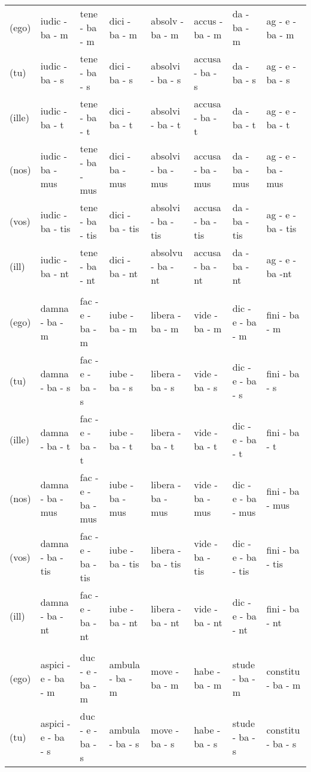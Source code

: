 \documentclass[a4paper, landscape]{article}
\begin{document}
\begin{landscape}
\begin{table}[]
\begin{tabular}{llllllll}
	(ego)	& iudic - ba - m   & tene - ba - m	 & dici - ba - m   & absolv - ba - m	& accus  - ba - m   & da - ba - m	& ag - e - ba - m \\ 
	(tu)	& iudic - ba - s   & tene - ba - s 	 & dici - ba - s   & absolvi - ba - s	& accusa - ba - s   & da - ba - s	& ag - e - ba - s \\
	(ille)	& iudic - ba - t   & tene - ba - t	 & dici - ba - t   & absolvi - ba - t	& accusa - ba - t   & da - ba - t	& ag - e - ba - t \\
	(nos)	& iudic - ba - mus & tene - ba - mus & dici - ba - mus & absolvi - ba - mus & accusa - ba - mus & da - ba - mus	& ag - e - ba - mus \\
	(vos)	& iudic - ba - tis & tene - ba - tis & dici - ba - tis & absolvi - ba - tis & accusa - ba - tis & da - ba - tis	& ag - e - ba - tis \\
	(ill)	& iudic - ba - nt  & tene - ba - nt  & dici - ba - nt  & absolvu - ba - nt	& accusa - ba - nt  & da - ba - nt	& ag - e - ba -nt \\
	& & & &  &  &  & \\
	(ego)	& damna - ba - m	& fac - e - ba - m		& iube - ba - m   & libera - ba - m   & vide - ba - m   & dic - e - ba - m	 & fini - ba - m  \\ 
	(tu)	& damna - ba - s	& fac - e - ba - s		& iube - ba - s	  & libera - ba - s   & vide - ba - s	& dic - e - ba - s	 & fini - ba - s \\
	(ille)	& damna - ba - t	& fac - e - ba - t		& iube - ba - t	  & libera - ba - t   & vide - ba - t	& dic - e - ba - t 	 & fini - ba - t  \\
	(nos)	& damna - ba - mus	& fac - e - ba - mus	& iube - ba - mus & libera - ba - mus & vide - ba - mus & dic - e - ba - mus & fini - ba - mus \\
	(vos)	& damna - ba - tis	& fac - e - ba - tis	& iube - ba - tis & libera - ba - tis & vide - ba - tis & dic - e - ba - tis & fini - ba - tis \\
	(ill)	& damna - ba - nt	& fac - e - ba - nt 	& iube - ba - nt  & libera - ba - nt  & vide - ba - nt  & dic - e - ba - nt	 & fini - ba - nt \\
	& & & &  &  &  & \\
	(ego)   & aspici - e - ba - m		& duc - e - ba - m		& ambula - ba - m	& move - ba - m		& habe - ba - m		& stude - ba - m    & constitu - ba - m \\
	(tu)	& aspici - e - ba - s		& duc - e - ba - s		& ambula - ba - s	& move - ba - s		& habe - ba - s		& stude - ba - s	& constitu - ba - s \\

\end{tabular}
\end{table}
\end{landscape}
\end{document}

